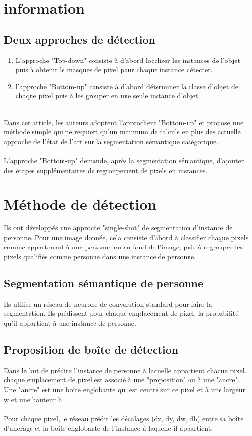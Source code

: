 \documentclass[11pt]{report}
\begin{document}
\section{information}
\subsection{Deux approches de détection}
\begin{enumerate}
	\item L'approche "Top-down" consiste à d'abord localiser les instances de l'objet puis à obtenir le masques de pixel pour chaque instance détecter.
	\item l'approche "Bottom-up" consiste à d'abord déterminer la classe d'objet de chaque pixel puis à les grouper en une seule instance d'objet. \\\\
\end{enumerate}
Dans cet article, les auteurs adoptent l'approchent "Bottom-up" et propose une méthode simple qui ne requiert qu'un minimum de calculs en plus des actuelle approche de l'état de l'art sur la segmentation sémantique catégorique.\\\\
L'approche "Bottom-up" demande, après la segmentation sémantique, d'ajouter des étapes supplémentaires de regroupement de pixels en instances.

\section{Méthode de détection}
Ils ont développés une approche "single-shot" de segmentation d'instance de personne. Pour une image donnée, cela consiste d'abord à classifier chaque pixels comme appartenant à une personne ou au fond de l'image, puis à regrouper les pixels qualifiés comme personne dans une instance de personne.

\subsection{Segmentation sémantique de personne}
Ils utilise un réseau de neurone de convolution standard pour faire la segmentation. Ils prédissent pour chaque emplacement de pixel, la probabilité qu'il appartient à une instance de personne.

\subsection{Proposition de boîte de détection}
Dans le but de prédire l'instance de personne à laquelle appartient chaque pixel, chaque emplacement de pixel est associé à une "proposition" ou à une "ancre". Une "ancre" est une boîte englobante qui est centré sur ce pixel et à une largeur w et une hauteur h.\\\\
Pour chaque pixel, le réseau prédit les décalages (dx, dy, dw, dh) entre sa boîte d'ancrage et la boîte englobante de l'instance à laquelle il appartient.
\end{document}
